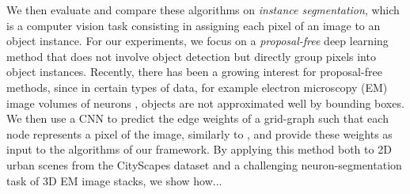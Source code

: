 We then evaluate and compare these algorithms on \emph{instance segmentation}, which is a computer vision task consisting in assigning each pixel of an image to an object instance. %
For our experiments, we focus on a \emph{proposal-free} deep learning method that does not involve object detection but directly group pixels into object instances. Recently, there has been a growing interest for proposal-free methods, since in certain types of data, for example electron microscopy (EM) image volumes of neurons \cite{arganda2015crowdsourcing}, objects are not approximated well by bounding boxes.
We then use a CNN to predict the edge weights of a grid-graph such that each node represents a pixel of the image, similarly to \cite{liu2018affinity,lee2017superhuman,wolf2018mutex}, and provide these weights as input to the algorithms of our framework. 
By applying this method both to 2D urban scenes from the CityScapes dataset and a challenging neuron-segmentation task of 3D EM image stacks, we show how... 



